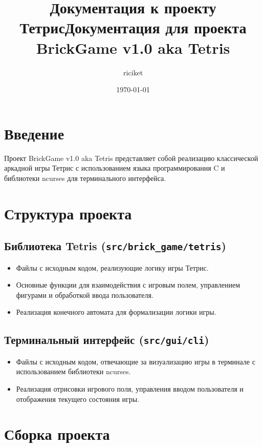 \documentclass[a4paper,12pt]{article}
\title{Документация к проекту Тетрис}
\author{riciket}
\date{\today}
\begin{document}
\title{Документация для проекта BrickGame v1.0 aka Tetris}
\date{}
\maketitle

\section{Введение}

Проект BrickGame v1.0 aka Tetris представляет собой реализацию классической аркадной игры Тетрис с использованием языка программирования C и библиотеки ncurses для терминального интерфейса.

\section{Структура проекта}

\subsection{Библиотека Tetris (\texttt{src/brick\_game/tetris})}

\begin{itemize}[label=--]
    \item Файлы с исходным кодом, реализующие логику игры Тетрис.
    \item Основные функции для взаимодействия с игровым полем, управлением фигурами и обработкой ввода пользователя.
    \item Реализация конечного автомата для формализации логики игры.
\end{itemize}

\subsection{Терминальный интерфейс (\texttt{src/gui/cli})}

\begin{itemize}[label=--]
    \item Файлы с исходным кодом, отвечающие за визуализацию игры в терминале с использованием библиотеки ncurses.
    \item Реализация отрисовки игрового поля, управления вводом пользователя и отображения текущего состояния игры.
\end{itemize}

\section{Сборка проекта}
\end{document}
